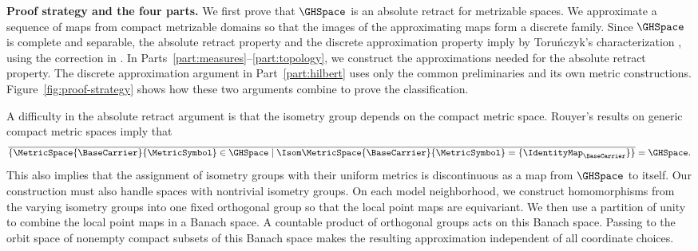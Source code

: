 \medskip
\noindent\textbf{Proof strategy and the four parts.}
We first prove that
$\GHSpace$
is an absolute retract for metrizable spaces.
We approximate a sequence of maps from compact metrizable domains so that
the images of the approximating maps form a discrete family.
Since
$\GHSpace$
is complete and separable,
the absolute retract property and the discrete approximation property
imply  by Toru\'nczyk's characterization
\cite[p.~248, assertion~(i)]{Torunczyk1981},
using the correction in
\cite[Section~C]{Torunczyk1985}.
In Parts~\ref{part:measures}--\ref{part:topology},
we construct the approximations needed for the absolute retract property.
The discrete approximation argument in Part~\ref{part:hilbert}
uses only the common preliminaries and its own metric constructions.
Figure~\ref{fig:proof-strategy}
shows how these two arguments combine to prove the classification.

A difficulty in the absolute retract argument is that the isometry group
depends on the compact metric space.
Rouyer's results on generic compact metric spaces
\cite[arXiv v1, Theorems~2 and~4]{Rouyer2011}
imply that
\[
 \overline{
 \{\MetricSpace{\BaseCarrier}{\MetricSymbol}\in\GHSpace
   \mid\Isom\MetricSpace{\BaseCarrier}{\MetricSymbol}
      =\{\IdentityMap_\BaseCarrier\}\}
 }=\GHSpace.
\]
This also implies that the assignment of isometry groups
with their uniform metrics is discontinuous as a map from
$\GHSpace$
to itself.
Our construction must also handle spaces with nontrivial isometry groups.
On each model neighborhood,
we construct homomorphisms from the varying isometry groups into one fixed
orthogonal group so that the local point maps are equivariant.
We then use a partition of unity to combine the local point maps in a Banach space.
A countable product of orthogonal groups acts on this Banach space.
Passing to the orbit space of nonempty compact subsets of this Banach space
makes the resulting approximation independent of all coordinate choices.

